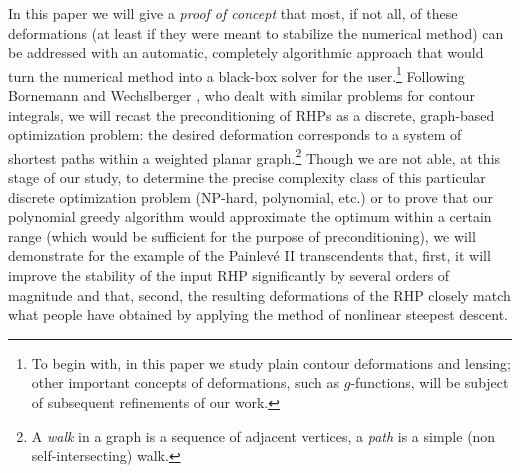 \documentclass[reqno]{amsart}
\begin{document}
In this paper we will give a \emph{proof of concept} that most, if not all, of these deformations (at least if they were meant to
stabilize the numerical method) can be 
addressed with an automatic, completely algorithmic approach that would turn the numerical method into a black-box solver for the user.\footnote{To begin with, in this paper we study plain contour deformations and lensing; other important concepts of deformations, such as $g$-functions, will be subject of subsequent refinements of our work.} Following 
Bornemann and Wechslberger \cite{1107.0498v2}, who dealt with similar problems for contour integrals, we will recast the preconditioning
of RHPs as a discrete, graph-based optimization problem: the desired deformation corresponds to a system of shortest paths within a weighted planar graph.\footnote{A {\em walk}  in a graph is a sequence of adjacent vertices, a {\em path} is a simple (non self-intersecting) walk.} 
Though we are not able, at this stage of our study, to determine the precise complexity class of this particular discrete optimization problem
(NP-hard, polynomial, etc.) or to prove that our polynomial greedy algorithm would approximate 
 the optimum within a certain range (which would be sufficient for the purpose of preconditioning), we will demonstrate for the example of the Painlevé II transcendents that, first, it will improve the stability of the input RHP significantly by several orders of magnitude and that, second, the resulting deformations of the RHP closely match what people have obtained by applying the method of nonlinear steepest descent. 
 
\end{document}
